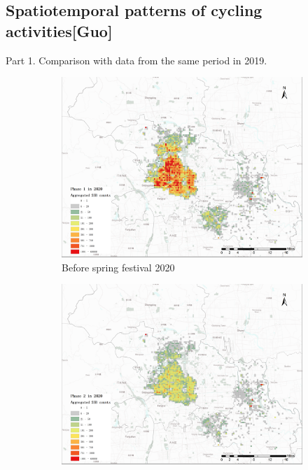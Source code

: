 \documentclass[preprints,ijgi,submit,moreauthors]{Definitions/mdpi}
\begin{document}
\subsection{Spatiotemporal patterns of cycling activities\textbf{[Guo]}}

Part 1. Comparison with data from the same period in 2019.

\begin{figure}[H]
    \begin{subfigure}{.3\textwidth}
        \includegraphics[width=\textwidth]{Figures/2020phase1(1).png}
        \caption{Before spring festival 2020}
    \end{subfigure}
    \begin{subfigure}{.3\textwidth}
        \includegraphics[width=\textwidth]{Figures/2020phase2(1).png}

\end{subfigure}
\end{figure}
\end{document}
